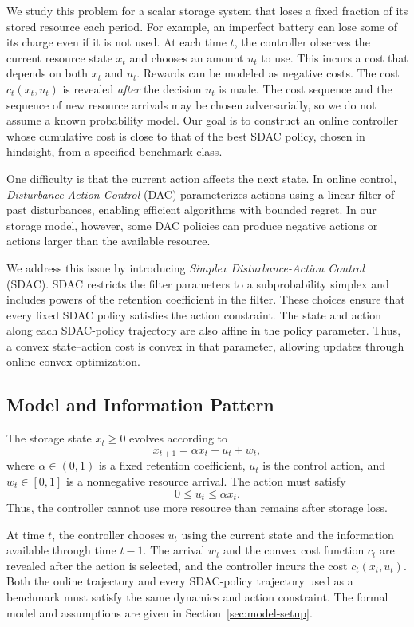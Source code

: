 \documentclass[journal]{IEEEtran}
\theoremstyle{remark}
\begin{document}
We study this problem for a scalar storage system that loses a fixed fraction of
its stored resource each period.
For example, an imperfect battery can lose some of its charge even if it is not used.
At each time $t$, the controller observes the current resource state $x_t$ and chooses an amount $u_t$ to use.
This incurs a cost that depends on both $x_t$ and $u_t$. Rewards can be modeled as negative costs.
The cost $c_t(x_t, u_t)$ is revealed \emph{after} the decision $u_t$ is made.
The cost sequence and the sequence of new resource arrivals may
be chosen adversarially, so we do not assume a known
probability model. Our goal is to construct an online controller whose
cumulative cost is close to that of the best SDAC policy, chosen in hindsight,
from a specified benchmark class.

One difficulty is that the current action affects the next state. In online control,
\emph{Disturbance-Action Control} (DAC) parameterizes actions using a linear filter
of past disturbances, enabling efficient algorithms with bounded regret.
In our storage model, however, some DAC policies can produce negative actions or
actions larger than the available resource.

We address this issue by introducing \emph{Simplex Disturbance-Action Control}
(SDAC). SDAC restricts the filter parameters to a subprobability simplex and includes
powers of the retention coefficient in the filter. These choices ensure that
every fixed SDAC policy satisfies the action constraint. The state and action
along each SDAC-policy trajectory are also affine in the policy parameter.
Thus, a convex state--action cost is convex in that parameter, allowing
updates through online convex optimization.

\subsection{Model and Information Pattern}

The storage state $x_t\ge0$ evolves according to
\[
x_{t+1}=\alpha x_t-u_t+w_t,
\]
where $\alpha\in(0,1)$ is a fixed retention coefficient, $u_t$ is the control
action, and $w_t\in[0,1]$ is a nonnegative resource arrival. The action must satisfy
\[
0\le u_t\le\alpha x_t.
\]
Thus, the controller cannot use more resource than remains after storage loss.

At time $t$, the controller chooses $u_t$ using the current state and the
information available through time $t-1$. The arrival $w_t$ and the convex cost
function $c_t$ are revealed after the action is selected, and the controller incurs
the cost $c_t(x_t,u_t)$. Both the online trajectory and every SDAC-policy
trajectory used as a benchmark must satisfy the same dynamics and action
constraint. The formal model and assumptions are given in
Section~\ref{sec:model-setup}.
\end{document}
